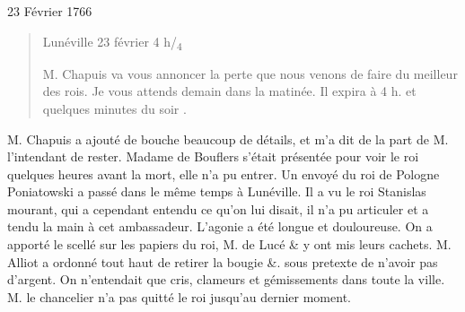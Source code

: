 \begin{diary}{23 Février 1766}{}
        
                        \begin{quote}\begin{flushright}Lunéville
                              23 février 4 h/\textsubscript{4}\end{flushright}
                              M. Chapuis va vous
                              annoncer la perte que
                              nous venons de faire du meilleur des rois. Je
                              vous attends demain dans la matinée. 
                                  Il expira
                                    à 4 h. et
                                       quelques minutes
                                       du soir
                                 . 
                           \bigskip
        
        \end{quote}
                        
                           M. Chapuis a ajouté de bouche
                           beaucoup de
                           détails, et m'a dit de la part de M.
                              l'intendant
                           de rester. Madame de Bouflers s'était présentée
                           pour voir le roi quelques
                           heures avant la
                           mort, elle n'a pu entrer. Un envoyé du roi
                              de Pologne Poniatowski a passé dans le même
                           temps à Lunéville. Il a
                           vu le roi Stanislas
                           mourant, qui a cependant entendu ce qu'on
                           lui disait, il n'a pu articuler et a tendu la main à cet
                           ambassadeur. L'agonie a été
                           longue et douloureuse. On a apporté le scellé
                           sur les papiers du roi,
                              M. de Lucé &
                           y ont mis leurs cachets. M.
                              Alliot a ordonné
                           tout haut de retirer la bougie &. sous pretexte
                           de n'avoir pas d'argent. On n'entendait que
                           cris, clameurs et gémissements dans toute
                           la ville. M. le chancelier
                           n'a pas quitté le
                              roi jusqu'au dernier moment. \bigskip
        
        
                     \end{diary}

